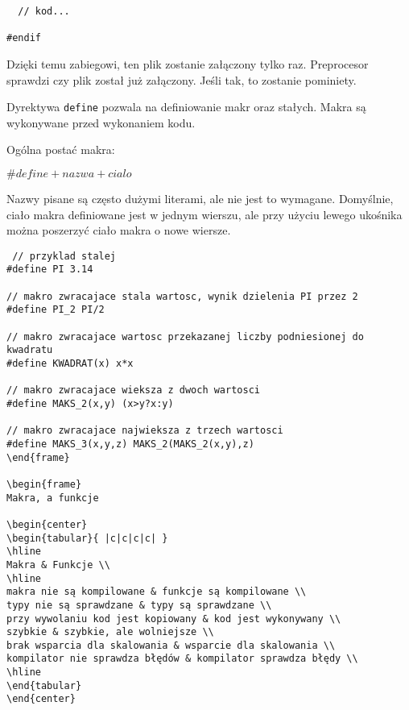 \documentclass[notheorems, aspectratio=54]{beamer}
\begin{document}
\begin{frame}
\begin{frame}
\begin{lstlisting}
  // kod...

#endif
\end{lstlisting}

Dzięki temu zabiegowi, ten plik zostanie załączony tylko raz. Preprocesor sprawdzi czy plik został już załączony.
Jeśli tak, to zostanie pominiety.
\end{frame}

\begin{frame}
Dyrektywa \texttt{define} pozwala na definiowanie makr oraz stałych. 
Makra są wykonywane przed wykonaniem kodu. 

Ogólna postać makra:

$\# define + nazwa + cialo$

Nazwy pisane są często dużymi literami, ale nie jest to wymagane.
Domyślnie, ciało makra definiowane jest w jednym wierszu, 
ale przy użyciu lewego ukośnika można poszerzyć ciało makra o nowe wiersze.

\begin{lstlisting}
 // przyklad stalej
#define PI 3.14

// makro zwracajace stala wartosc, wynik dzielenia PI przez 2
#define PI_2 PI/2

// makro zwracajace wartosc przekazanej liczby podniesionej do kwadratu
#define KWADRAT(x) x*x

// makro zwracajace wieksza z dwoch wartosci
#define MAKS_2(x,y) (x>y?x:y)

// makro zwracajace najwieksza z trzech wartosci
#define MAKS_3(x,y,z) MAKS_2(MAKS_2(x,y),z) 
\end{frame}

\begin{frame}
Makra, a funkcje

\begin{center}
\begin{tabular}{ |c|c|c|c| } 
\hline
Makra & Funkcje \\
\hline
makra nie są kompilowane & funkcje są kompilowane \\
typy nie są sprawdzane & typy są sprawdzane \\
przy wywolaniu kod jest kopiowany & kod jest wykonywany \\
szybkie & szybkie, ale wolniejsze \\
brak wsparcia dla skalowania & wsparcie dla skalowania \\
kompilator nie sprawdza błędów & kompilator sprawdza błędy \\
\hline
\end{tabular}
\end{center}


\end{lstlisting}
\end{frame}
\end{frame}
\end{document}
